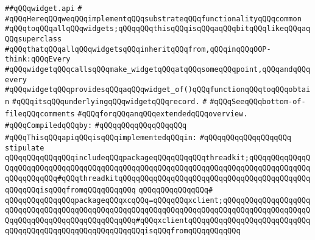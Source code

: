 \label{src/lib/x-kit/widget/old/basic/widget.api}
\verb|##qQQqwidget.api|\newline
\verb|#|\newline
\verb|#qQQqHereqQQqweqQQqimplementqQQqsubstrateqQQqfunctionalityqQQqcommon|\newline
\verb|#qQQqtoqQQqallqQQqwidgets;qQQqqQQqthisqQQqisqQQqaqQQqbitqQQqlikeqQQqaqQQqsuperclass|\newline
\verb|#qQQqthatqQQqallqQQqwidgetsqQQqinheritqQQqfrom,qQQqinqQQqOOP-think:qQQqEvery|\newline
\verb|#qQQqwidgetqQQqcallsqQQqmake_widgetqQQqatqQQqsomeqQQqpoint,qQQqandqQQqevery|\newline
\verb|#qQQqwidgetqQQqprovidesqQQqaqQQqwidget_of()qQQqfunctionqQQqtoqQQqobtain|\newline
\verb|#qQQqitsqQQqunderlyingqQQqwidgetqQQqrecord.|\newline
\verb|#|\newline
\verb|#qQQqSeeqQQqbottom-of-fileqQQqcomments|\newline
\verb|#qQQqforqQQqanqQQqextendedqQQqoverview.|\newline
\newline
\verb|#qQQqCompiledqQQqby:|\newline
\verb|#qQQqqQQqqQQqqQQqqQQq|\newline
\newline
\newline
\verb|#qQQqThisqQQqapiqQQqisqQQqimplementedqQQqin:|\newline
\verb|#qQQqqQQqqQQqqQQqqQQq|\newline
\newline
\verb|stipulate|\newline
\verb|qQQqqQQqqQQqqQQqincludeqQQqpackageqQQqqQQqqQQqthreadkit;qQQqqQQqqQQqqQQqqQQqqQQqqQQqqQQqqQQqqQQqqQQqqQQqqQQqqQQqqQQqqQQqqQQqqQQqqQQqqQQqqQQqqQQqqQQqqQQq#qQQqthreadkitqQQqqQQqqQQqqQQqqQQqqQQqqQQqqQQqqQQqqQQqqQQqqQQqqQQqisqQQqfromqQQqqQQqqQQq|\newline
\verb|qQQqqQQqqQQqqQQq#|\newline
\verb|qQQqqQQqqQQqqQQqpackageqQQqxcqQQq=qQQqqQQqxclient;qQQqqQQqqQQqqQQqqQQqqQQqqQQqqQQqqQQqqQQqqQQqqQQqqQQqqQQqqQQqqQQqqQQqqQQqqQQqqQQqqQQqqQQqqQQqqQQqqQQqqQQqqQQqqQQqqQQqqQQq#qQQqxclientqQQqqQQqqQQqqQQqqQQqqQQqqQQqqQQqqQQqqQQqqQQqqQQqqQQqqQQqqQQqisqQQqfromqQQqqQQqqQQq|\newline
